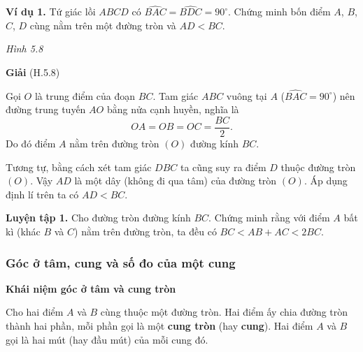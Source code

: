 \begin{lesson}
    \textbf{Ví dụ 1.} Tứ giác lồi $ABCD$ có $\widehat{BAC}=\widehat{BDC}=90^\circ$. Chứng minh bốn điểm $A$, $B$, $C$, $D$ cùng nằm trên một đường tròn và $AD<BC$.

    \begin{center}

        \textit{Hình 5.8}
    \end{center}

    \textbf{Giải} (H.5.8)

    Gọi $O$ là trung điểm của đoạn $BC$. Tam giác $ABC$ vuông tại $A$ ($\widehat{BAC}=90^\circ$) nên đường trung tuyến $AO$ bằng nửa cạnh huyền, nghĩa là
    \[
        OA=OB=OC=\dfrac{BC}{2}.
    \]
    Do đó điểm $A$ nằm trên đường tròn $(O)$ đường kính $BC$.

    Tương tự, bằng cách xét tam giác $DBC$ ta cũng suy ra điểm $D$ thuộc đường tròn $(O)$. Vậy $AD$ là một dây (không đi qua tâm) của đường tròn $(O)$. Áp dụng định lí trên ta có $AD<BC$.

    \textbf{Luyện tập 1.} Cho đường tròn đường kính $BC$. Chứng minh rằng với điểm $A$ bất kì (khác $B$ và $C$) nằm trên đường tròn, ta đều có $BC<AB+AC<2BC$.

    \answerline
    \answerline

    \subsubsection{Góc ở tâm, cung và số đo của một cung}

    \textbf{Khái niệm góc ở tâm và cung tròn}

    Cho hai điểm $A$ và $B$ cùng thuộc một đường tròn. Hai điểm ấy chia đường tròn thành hai phần, mỗi phần gọi là một \textbf{cung tròn} (hay \textbf{cung}). Hai điểm $A$ và $B$ gọi là hai mút (hay đầu mút) của mỗi cung đó.


\end{lesson}
